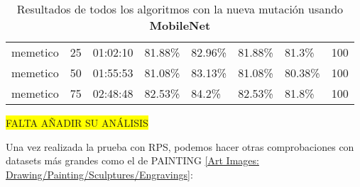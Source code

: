 \begin{table}[htp]
{\begin{tabular}{lp{2cm}lp{2cm}p{2cm}p{2cm}p{2cm}p{2.2cm}}
            memetico                 & 25                          & 01:02:10                & 81.88\%                          & 82.96\% & 81.88\% & 81.3\%  & 100 \\
            memetico                 & 50                          & 01:55:53                & 81.08\%                          & 83.13\% & 81.08\% & 80.38\% & 100 \\
            memetico                 & 75                          & 02:48:48                & 82.53\%                          & 84.2\%  & 82.53\% & 81.8\%  & 100 \\
            \bottomrule
        \end{tabular}
    }
    \caption{Resultados de todos los algoritmos con la nueva mutación usando \textbf{MobileNet}}
    \label{tab:generation-rps-with-new-mutation}
\end{table}

\colorbox{yellow}{FALTA AÑADIR SU ANÁLISIS}


Una vez realizada la prueba con RPS, podemos hacer otras comprobaciones con datasets más grandes como el de PAINTING
\hyperref[subsec:painting]{[Art Images: Drawing/Painting/Sculptures/Engravings]}:
\begin{table}[htp]
    \centering
    \caption{Resultados de todos los algoritmos para PAINTING con la nueva mutación usando \textbf{MobileNet}}
    \label{tab:generation-painting-with-new-mutation}
\end{table}

